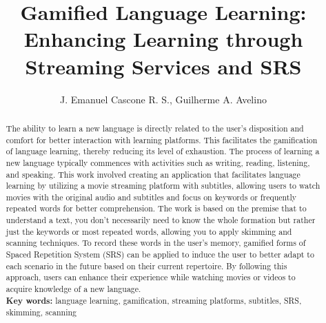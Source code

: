 \documentclass[12pt]{article}
\title{Gamified Language Learning: Enhancing Learning through Streaming Services and SRS}
\author{J. Emanuel Cascone R. S.\inst{1}, Guilherme A. Avelino\inst{1} }
\begin{document}
 

\maketitle

\begin{abstract} 
  The ability to learn a new language is directly related to the user's disposition and comfort for better interaction with learning platforms. This facilitates the gamification of language learning, thereby reducing its level of exhaustion. The process of learning a new language typically commences with activities such as writing, reading, listening, and speaking. This work involved creating an application that facilitates language learning by utilizing a movie streaming platform with subtitles, allowing users to watch movies with the original audio and subtitles and focus on keywords or frequently repeated words for better comprehension. The work is based on the premise that to understand a text, you don't necessarily need to know the whole formation but rather just the keywords or most repeated words, allowing you to apply skimming and scanning techniques. To record these words in the user's memory, gamified forms of Spaced Repetition System (SRS) can be applied to induce the user to better adapt to each scenario in the future based on their current repertoire. By following this approach, users can enhance their experience while watching movies or videos to acquire knowledge of a new language. \\
  \textbf{Key words:} language learning, gamification, streaming platforms, subtitles, SRS, skimming, scanning
\end{abstract} 
\end{document}

